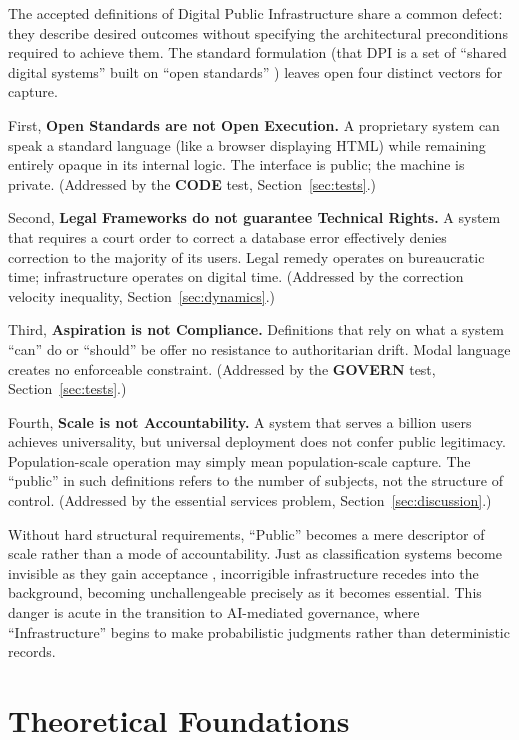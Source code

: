 \documentclass{article}
\begin{document}
The accepted definitions of Digital Public Infrastructure share a common defect: they describe desired outcomes without specifying the architectural preconditions required to achieve them. The standard formulation (that DPI is a set of ``shared digital systems'' built on ``open standards'' \citep{g20}) leaves open four distinct vectors for capture.

First, \textbf{Open Standards are not Open Execution.} A proprietary system can speak a standard language (like a browser displaying HTML) while remaining entirely opaque in its internal logic. The interface is public; the machine is private. (Addressed by the \textbf{CODE} test, Section~\ref{sec:tests}.)

Second, \textbf{Legal Frameworks do not guarantee Technical Rights.} A system that requires a court order to correct a database error effectively denies correction to the majority of its users. Legal remedy operates on bureaucratic time; infrastructure operates on digital time. (Addressed by the correction velocity inequality, Section~\ref{sec:dynamics}.)

Third, \textbf{Aspiration is not Compliance.} Definitions that rely on what a system ``can'' do or ``should'' be offer no resistance to authoritarian drift. Modal language creates no enforceable constraint. (Addressed by the \textbf{GOVERN} test, Section~\ref{sec:tests}.)

Fourth, \textbf{Scale is not Accountability.} A system that serves a billion users achieves universality, but universal deployment does not confer public legitimacy. Population-scale operation may simply mean population-scale capture. The ``public'' in such definitions refers to the number of subjects, not the structure of control. (Addressed by the essential services problem, Section~\ref{sec:discussion}.)

Without hard structural requirements, ``Public'' becomes a mere descriptor of scale rather than a mode of accountability. Just as classification systems become invisible as they gain acceptance \citep{bowker1999}, incorrigible infrastructure recedes into the background, becoming unchallengeable precisely as it becomes essential. This danger is acute in the transition to AI-mediated governance, where ``Infrastructure'' begins to make probabilistic judgments rather than deterministic records.

\section{Theoretical Foundations}
\label{sec:theory}
\end{document}
